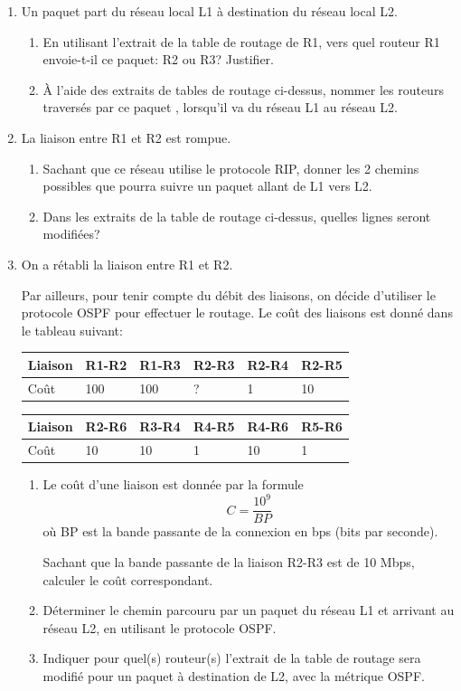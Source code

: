 \documentclass[11pt,a4paper]{article}
\newcounter{num}
\begin{document}
\begin{enumerate}
\item Un paquet part du réseau local L1 à destination du réseau local L2.
\begin{enumerate}
\item En utilisant l'extrait de la table de routage de R1, vers quel routeur R1 envoie-t-il ce paquet: R2 ou R3? Justifier.
\item À l'aide des extraits de tables de routage ci-dessus, nommer les routeurs traversés par ce paquet , lorsqu'il va du réseau L1 au réseau L2.
\end{enumerate} 
\item La liaison entre R1 et R2 est rompue.
\begin{enumerate}
\item Sachant que ce réseau utilise le protocole RIP, donner les 2 chemins possibles que pourra suivre un paquet allant de L1 vers L2.
\item Dans les extraits de la table de routage ci-dessus, quelles lignes seront modifiées?
\end{enumerate} 

\item On a rétabli la liaison entre R1 et R2.

Par ailleurs, pour tenir compte du débit des liaisons, on décide d'utiliser le protocole OSPF pour effectuer le routage. Le coût des liaisons est donné dans le tableau suivant:

\begin{center}
\begin{tabular}{|L{1.5cm}*{5}{|C{1.2cm}}|}\hline
Liaison & R1-R2 & R1-R3 & R2-R3 & R2-R4 & R2-R5 \\\hline
Coût & 100 & 100 & ? & 1 & 10 \\\hline
\end{tabular}

\begin{tabular}{|L{1.5cm}*{5}{|C{1.2cm}}|}\hline
Liaison & R2-R6 & R3-R4 & R4-R5 & R4-R6 & R5-R6\\\hline
Coût & 10 & 10 & 1 & 10 & 1\\\hline
\end{tabular}
\end{center}

\begin{enumerate}
\item Le coût d'une liaison est donnée par la formule 
$$C=\dfrac{10^{9}}{BP}$$
où BP est la bande passante de la connexion en bps (bits par seconde).

Sachant que la bande passante de la liaison R2-R3 est de 10 Mbps, calculer le coût correspondant.
\item Déterminer le chemin parcouru par un paquet du réseau L1 et arrivant au réseau L2, en utilisant le protocole OSPF.
\item Indiquer pour quel(s) routeur(s) l'extrait de la table de routage sera modifié pour un paquet à destination de L2, avec la métrique OSPF.
\end{enumerate}
\end{enumerate}
\end{document}
